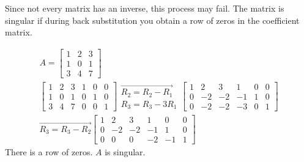 \documentclass[../main.tex]{subfiles}
\begin{document}
Since not every matrix has an inverse, this process may fail. The matrix is singular if during back substitution you obtain a row of zeros in the coefficient matrix.

\begin{example}
$$
\begin{array}{l}
 A=\left[\begin{array}{lll}
1 & 2 & 3 \\
1 & 0 & 1 \\
3 & 4 & 7
\end{array}\right] \\
{\left[\begin{array}{lll|lll}
	1 & 2 & 3 & 1 & 0 & 0 \\
	1 & 0 & 1 & 0 & 1 & 0 \\
	3 & 4 & 7 & 0 & 0 & 1
	\end{array}\right] \begin{array}{l}
	\overrightarrow{R_{2}=R_{2}-R_{1}} \\
	R_{3}=R_{3}-3 R_{1}
	\end{array}\left[\begin{array}{ccc|ccc}
	1 & 2 & 3 & 1 & 0 & 0 \\
	0 & -2 & -2 & -1 & 1 & 0 \\
	0 & -2 & -2 & -3 & 0 & 1
	\end{array}\right]} \\
\overrightarrow{R_{3}=R_{3}-R_{2}}\left[\begin{array}{ccc|ccc}
1 & 2 & 3 & 1 & 0 & 0 \\
0 & -2 & -2 & -1 & 1 & 0 \\
0 & 0 & 0 & -2 & -1 & 1
\end{array}\right]
\end{array}
$$
There is a row of zeros. $A$ is singular.
\end{example}
\end{document}
